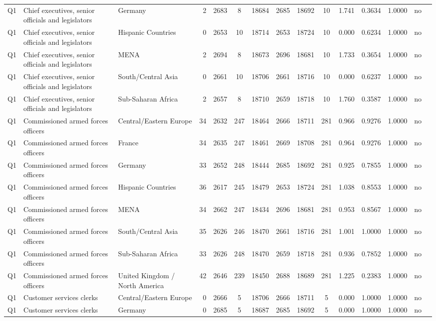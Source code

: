 \begin{longtable}{lllrcccccccccll}
Q1 & Chief executives, senior officials and legislators & Germany & 2 & 2683 & 8 & 18684 & 2685 & 18692 & 10 & 1.741 & 0.3634 & 1.0000 & no \\
Q1 & Chief executives, senior officials and legislators & Hispanic Countries & 0 & 2653 & 10 & 18714 & 2653 & 18724 & 10 & 0.000 & 0.6234 & 1.0000 & no \\
Q1 & Chief executives, senior officials and legislators & MENA & 2 & 2694 & 8 & 18673 & 2696 & 18681 & 10 & 1.733 & 0.3654 & 1.0000 & no \\
Q1 & Chief executives, senior officials and legislators & South/Central Asia & 0 & 2661 & 10 & 18706 & 2661 & 18716 & 10 & 0.000 & 0.6237 & 1.0000 & no \\
Q1 & Chief executives, senior officials and legislators & Sub-Saharan Africa & 2 & 2657 & 8 & 18710 & 2659 & 18718 & 10 & 1.760 & 0.3587 & 1.0000 & no \\
Q1 & Commissioned armed forces officers & Central/Eastern Europe & 34 & 2632 & 247 & 18464 & 2666 & 18711 & 281 & 0.966 & 0.9276 & 1.0000 & no \\
Q1 & Commissioned armed forces officers & France & 34 & 2635 & 247 & 18461 & 2669 & 18708 & 281 & 0.964 & 0.9276 & 1.0000 & no \\
Q1 & Commissioned armed forces officers & Germany & 33 & 2652 & 248 & 18444 & 2685 & 18692 & 281 & 0.925 & 0.7855 & 1.0000 & no \\
Q1 & Commissioned armed forces officers & Hispanic Countries & 36 & 2617 & 245 & 18479 & 2653 & 18724 & 281 & 1.038 & 0.8553 & 1.0000 & no \\
Q1 & Commissioned armed forces officers & MENA & 34 & 2662 & 247 & 18434 & 2696 & 18681 & 281 & 0.953 & 0.8567 & 1.0000 & no \\
Q1 & Commissioned armed forces officers & South/Central Asia & 35 & 2626 & 246 & 18470 & 2661 & 18716 & 281 & 1.001 & 1.0000 & 1.0000 & no \\
Q1 & Commissioned armed forces officers & Sub-Saharan Africa & 33 & 2626 & 248 & 18470 & 2659 & 18718 & 281 & 0.936 & 0.7852 & 1.0000 & no \\
Q1 & Commissioned armed forces officers & United Kingdom / North America & 42 & 2646 & 239 & 18450 & 2688 & 18689 & 281 & 1.225 & 0.2383 & 1.0000 & no \\
Q1 & Customer services clerks & Central/Eastern Europe & 0 & 2666 & 5 & 18706 & 2666 & 18711 & 5 & 0.000 & 1.0000 & 1.0000 & no \\
Q1 & Customer services clerks & Germany & 0 & 2685 & 5 & 18687 & 2685 & 18692 & 5 & 0.000 & 1.0000 & 1.0000 & no \\

\end{longtable}
